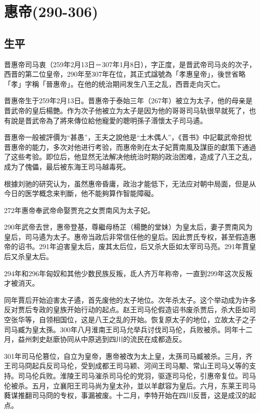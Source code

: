 
\section{惠帝\tiny(290-306)}

\subsection{生平}

晋惠帝司马衷（259年2月13日－307年1月8日），字正度，是晋武帝司马炎的次子，西晋的第二位皇帝，290年至307年在位，其正式諡號為「孝惠皇帝」，後世省略「孝」字稱「晉惠帝」。在他的统治期间发生八王之乱，西晋走向灭亡。

晋惠帝生于259年2月13日。晋惠帝于泰始三年（267年）被立为太子，他的母亲是晋武帝的皇后楊艷。作为次子他被立为太子是因为他的哥哥司马轨很早就死了，也有說是晋武帝為了將來傳位給他寵愛的聰明孫子湣懷太子司马遹。

晋惠帝一般被評價为“甚愚”，王夫之說他是“土木偶人”，《晋书》中記載武帝担忧晋惠帝的能力，多次对他进行考验，而惠帝則在太子妃賈南風及謀臣的獻策下通過了这些考验。即位后，他显然无法解决他统治时期的政治困难，造成了八王之乱，成为了傀儡，最后被东海王司马越毒死。

根據刘驰的研究认为，虽然惠帝昏庸，政治才能低下，无法应对朝中局面，但是从今日的医学概念来判斷，他不能夠算作智能障礙。

272年惠帝奉武帝命娶贾充之女贾南风为太子妃。

290年武帝去世，惠帝登基，尊繼母杨芷（楊艷的堂妹）为皇太后，妻子贾南风为皇后，司马遹为太子。惠帝当政后非常信任他的皇后。因此贾氏专权，甚至假造惠帝的诏书。291年迫害皇太后，废其太后位，后又杀大臣如太宰司马亮。291年賈皇后又杀皇太后。

294年和296年匈奴和其他少数民族反叛，氐人齐万年称帝，一直到299年这次反叛才被消灭。

同年賈后开始迫害太子遹，首先废他的太子地位。次年杀太子。这个举动成为许多反对贾后专政的皇族开始行动的起点。赵王司马伦假造诏书废杀贾后，杀大臣如司空张华等，自领相国位，这是八王之乱的开始。恢复原太子的地位，立故太子之子司马臧为皇太孫。300年八月淮南王司马允举兵讨伐司马伦，兵败被杀。同年十二月，益州刺史赵廞协同从中原逃到四川的流民在成都造反。

301年司马伦篡位，自立为皇帝，惠帝被改为太上皇，太孫司马臧被杀。三月，齐王司马冏起兵反司马伦，受到成都王司马颖、河间王司马颙、常山王司马乂等的支持。司马伦兵败。淮陵王司马漼杀司马伦的党羽，驱逐司马伦，引惠帝复位。司马伦被杀。五月，立襄阳王司马尚为皇太孙，並以羊獻容为皇后。六月，东莱王司马蕤谋推翻司马冏的专权，事漏被废。十二月，李特开始在四川反晋，这是成汉的起点。

